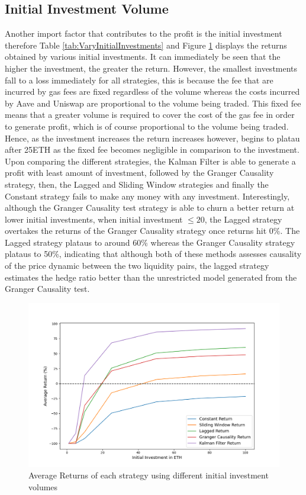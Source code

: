 \subsection{Initial Investment Volume}
Another import factor that contributes to the profit is the initial investment therefore Table \ref{tab:VaryInitialInvestments} and Figure \ref{fig:VaryInitialInvestments} displays the returns obtained by various initial investments. It can immediately be seen that the higher the investment, the greater the return. However, the smallest investments fall to a loss immediately for all strategies, this is because the fee that are incurred by gas fees are fixed regardless of the volume whereas the costs incurred by Aave and Uniswap are proportional to the volume being traded. This fixed fee means that a greater volume is required to cover the cost of the gas fee in order to generate profit, which is of course proportional to the volume being traded. Hence, as the investment increases the return increases however, begins to platau after 25ETH as the fixed fee becomes negligible in comparison to the investment.
\\[5mm]
Upon comparing the different strategies, the Kalman Filter is able to generate a profit with least amount of investment, followed by the Granger Causality strategy, then, the Lagged and Sliding Window strategies and finally the Constant strategy fails to make any money with any investment. Interestingly, although the Granger Causality test strategy is able to churn a better return at lower initial investments, when initial investment $\leq 20$, the Lagged strategy overtakes the returns of the Granger Causality strategy once returns hit 0\%. The Lagged strategy plataus to around 60\% whereas the Granger Causality strategy plataus to 50\%, indicating that although both of these methods assesses causality of the price dynamic between the two liquidity pairs, the lagged strategy estimates the hedge ratio better than the unrestricted model generated from the Granger Causality test.

\begin{figure}[H]
    \centering
    \includegraphics[width=\linewidth]{evaluation/Images/VaryII.png}
    \caption{Average Returns of each strategy using different initial investment volumes}
    \label{fig:VaryInitialInvestments}
\end{figure}

